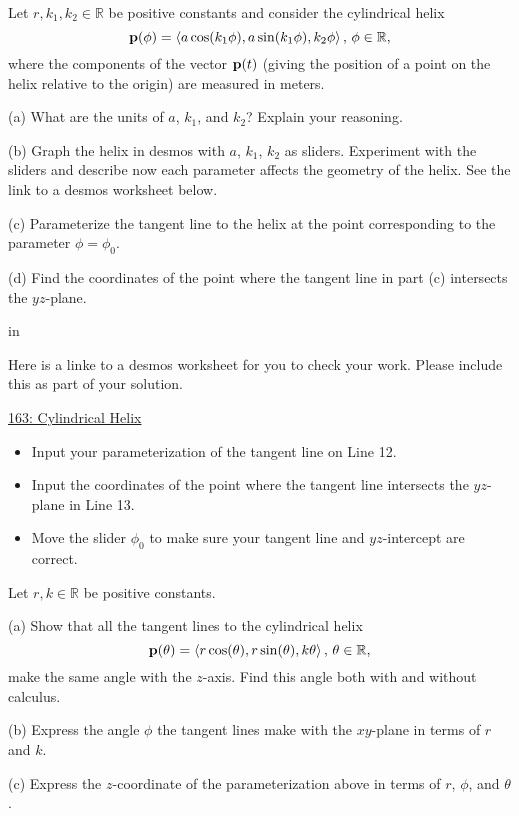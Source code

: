 \documentclass{ximera}
\newcommand{\pskip}{\vskip 0.1 in}
\begin{document}
\begin{question}  \label{Qvhsdsdgt:Motion}
Let $r,k_1, k_2\in\mathbb{R}$ be positive constants and consider the cylindrical helix
\[
  {\bf p}(\phi) =  \langle a \cos (k_1 \phi) , a \sin (k_1 \phi) , k_2 \phi \rangle \, , \, \phi \in \mathbb{R}, 
\]
where the components of the vector ${\bf p}(t)$ (giving the position of a point on the helix relative to the origin) are measured in meters.

(a) What are the units of $a$, $k_1$, and $k_2$? Explain your reasoning.

(b) Graph the helix in desmos with $a$, $k_1$, $k_2$ as sliders. Experiment with the sliders and describe now each parameter affects the geometry of the helix. See the link to a desmos worksheet below.

(c) Parameterize the tangent line to the helix at the point corresponding to the parameter $\phi = \phi_0$.

(d) Find the coordinates of the point where the tangent line in part (c) intersects the $yz$-plane. 

\pskip

Here is a linke to a desmos worksheet for you to check your work. Please include this as part of your solution.

\href{https://www.desmos.com/3d/9b85b075ac}{163: Cylindrical Helix}

\begin{itemize}
\item{Input your parameterization of the tangent line on Line 12.}

\item{Input the coordinates of the point where the tangent line intersects the $yz$-plane in Line 13.}

\item{Move the slider $\phi_0$ to make sure your tangent line and $yz$-intercept are correct.}

\end{itemize}

\end{question}


\begin{question}  \label{Qvhyu55:Motion}
Let $r,k\in\mathbb{R}$ be positive constants. 

(a) Show that all the tangent lines to the cylindrical helix
\[
  {\bf p}(\theta) =  \langle r \cos (\theta) , r \sin (\theta) , k \theta \rangle \, , \, \theta \in \mathbb{R}, 
\]
make the same angle with the $z$-axis. Find this angle both with and without calculus. 

(b) Express the angle $\phi$ the tangent lines make with the $xy$-plane in terms of $r$ and $k$.

(c) Express the $z$-coordinate of the parameterization above in terms of $r$, $\phi$, and $\theta$.
\end{question}
\end{document}
